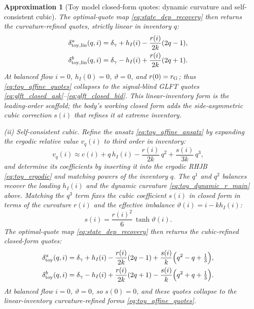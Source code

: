 \documentclass[11pt,a4paper]{article}
\theoremstyle{plain}
\newtheorem{approximation}[proposition]{Approximation}
\theoremstyle{definition}
\begin{document}
\begin{approximation}[Toy model closed-form quotes: dynamic curvature and self-consistent cubic]
The optimal-quote map \eqref{eq:state_dep_recovery} then returns the curvature-refined quotes, strictly linear in inventory \(q\):
\begin{align}
\delta_{\rm toy,lin}^a(q,i)
&=\delta_\gamma+h_I(i)-\frac{r(i)}{2k}(2q-1),
\notag\\
\delta_{\rm toy,lin}^b(q,i)
&=\delta_\gamma-h_I(i)+\frac{r(i)}{2k}(2q+1).
\label{eq:toy_affine_quotes}
\end{align}
At balanced flow \(i=0\), \(h_I(0)=0\), \(\vartheta=0\), and \(r(0)=r_{\rm G}\); thus \eqref{eq:toy_affine_quotes} collapses to the signal-blind GLFT quotes \eqref{eq:glft_closed_ask}--\eqref{eq:glft_closed_bid}. This linear-inventory form is the leading-order scaffold; the body's working closed form adds the side-asymmetric cubic correction \(s(i)\) that refines it at extreme inventory.

\smallskip\noindent\emph{(ii) Self-consistent cubic.}  Refine the ansatz \eqref{eq:toy_affine_ansatz} by expanding the ergodic relative value \(v_q(i)\) to third order in inventory:
\begin{equation}
v_q(i)\approx c(i)+q\,h_I(i)-\frac{r(i)}{2k}\,q^2+\frac{s(i)}{3k}\,q^3 ,
\label{eq:toy_cubic_ansatz}
\end{equation}
and determine its coefficients by inserting it into the ergodic RHJB \eqref{eq:toy_ergodic} and matching powers of the inventory \(q\). The \(q^1\) and \(q^2\) balances recover the loading \(h_I(i)\) and the dynamic curvature \eqref{eq:toy_dynamic_r_main} above. Matching the \(q^3\) term fixes the cubic coefficient \(s(i)\) in closed form in terms of the curvature \(r(i)\) and the effective imbalance \(\vartheta(i)=i-kh_I(i)\):
\begin{equation}
s(i)=\frac{r(i)^2}{6}\,\tanh\vartheta(i).
\label{eq:toy_curvature_rs}
\end{equation}
The optimal-quote map \eqref{eq:state_dep_recovery} then returns the cubic-refined closed-form quotes:
\begin{align}
\delta_{\rm toy}^a(q,i)
&=\delta_\gamma+h_I(i)-\frac{r(i)}{2k}(2q-1)
+\frac{s(i)}{k}\Bigl(q^2-q+\tfrac13\Bigr),
\notag\\
\delta_{\rm toy}^b(q,i)
&=\delta_\gamma-h_I(i)+\frac{r(i)}{2k}(2q+1)
-\frac{s(i)}{k}\Bigl(q^2+q+\tfrac13\Bigr).
\label{eq:toy_curvature_quotes}
\end{align}
At balanced flow \(i=0\), \(\vartheta=0\), so \(s(0)=0\), and these quotes collapse to the linear-inventory curvature-refined forms \eqref{eq:toy_affine_quotes}.
\end{approximation}
\end{document}
